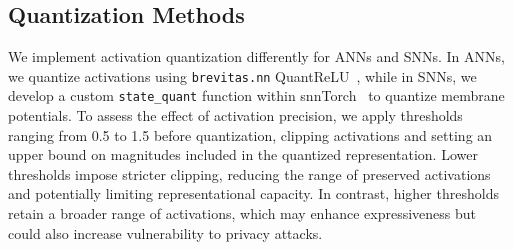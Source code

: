 \subsection{Quantization Methods}









\noindent
We implement activation quantization differently for ANNs and SNNs. In ANNs, we quantize activations using \texttt{brevitas.nn} QuantReLU~\cite{brevitas}, while in SNNs, we develop a custom \texttt{state\_quant} function within snnTorch~\cite{eshraghian2021training} to quantize membrane potentials. To assess the effect of activation precision, we apply thresholds ranging from 0.5 to 1.5 before quantization, clipping activations and setting an upper bound on magnitudes included in the quantized representation. Lower thresholds impose stricter clipping, reducing the range of preserved activations and potentially limiting representational capacity. In contrast, higher thresholds retain a broader range of activations, which may enhance expressiveness but could also increase vulnerability to privacy attacks.

